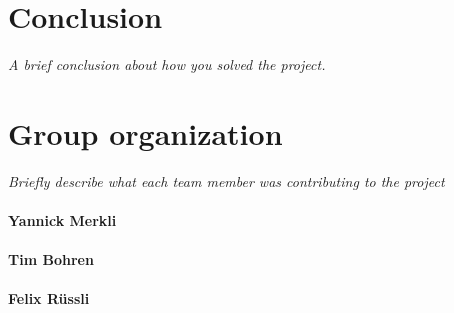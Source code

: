 \documentclass[11pt,oneside,a4paper]{article}
\newcommand{\hint}[1]{{\color{blue} \em #1}}
\begin{document}
\lipsum[1-2]

\section{Conclusion}
\hint{A brief conclusion about how you solved the project.} \\
\lipsum[1]

\label{lastpage} %
\clearpage
{}



\clearpage
\appendix
{}

\section{Group organization}
\hint{Briefly describe what each team member was contributing to the project}

\paragraph{Yannick Merkli}
\lipsum[2]

\paragraph{Tim Bohren}
\lipsum[3]

\paragraph{Felix Rüssli}
\lipsum[4]
\end{document}
